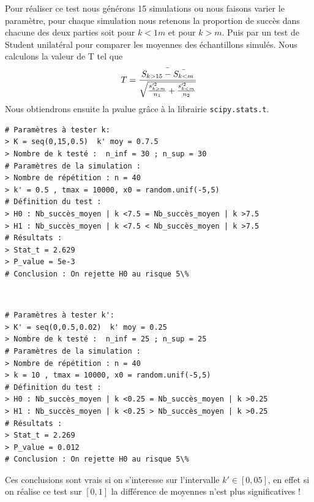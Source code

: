 \documentclass[12pt]{article}
\begin{document}
Pour réaliser ce test nous générons 15 simulations ou nous faisons varier le paramètre, pour chaque simulation nous retenons la proportion de succès dans chacune des deux parties soit pour $k<1m$ et pour $k>m$. Puis par un test de Student unilatéral pour comparer les moyennes des échantillons simulés. Nous calculons la valeur de T tel que $$T = \frac{\Bar{S_{k>15} - \Bar{S_{k<m}}}}{\sqrt{\frac{s'^2_{k>m}}{n_1} + \frac{s'^2_{k<m}}{n_2}}    }$$
Nous obtiendrons ensuite la pvalue grâce à la librairie \verb|scipy.stats.t|.

\begin{scriptsize}
\begin{verbatim}
# Paramètres à tester k:
> K = seq(0,15,0.5)  k' moy = 0.7.5   
> Nombre de k testé :  n_inf = 30 ; n_sup = 30
# Paramètres de la simulation : 
> Nombre de répétition : n = 40
> k' = 0.5 , tmax = 10000, x0 = random.unif(-5,5)
# Définition du test :
> H0 : Nb_succès_moyen | k <7.5 = Nb_succès_moyen | k >7.5 
> H1 : Nb_succès_moyen | k <7.5 < Nb_succès_moyen | k >7.5 
# Résultats :
> Stat_t = 2.629
> P_value = 5e-3
# Conclusion : On rejette H0 au risque 5\%
\end{verbatim}
\end{scriptsize}
\\
\begin{scriptsize}
\begin{verbatim}
# Paramètres à tester k':
> K' = seq(0,0.5,0.02)  k' moy = 0.25   
> Nombre de k testé :  n_inf = 25 ; n_sup = 25
# Paramètres de la simulation : 
> Nombre de répétition : n = 40
> k = 10 , tmax = 10000, x0 = random.unif(-5,5)
# Définition du test :
> H0 : Nb_succès_moyen | k <0.25 = Nb_succès_moyen | k >0.25 
> H1 : Nb_succès_moyen | k <0.25 > Nb_succès_moyen | k >0.25 
# Résultats :
> Stat_t = 2.269
> P_value = 0.012
# Conclusion : On rejette H0 au risque 5\%
\end{verbatim}
\end{scriptsize}

Ces conclusions sont vrais si on s'interesse sur l'intervalle $k'\in[0,05]$, en effet si on réalise ce test sur $[0,1]$ la différence de moyennes n'est plus significatives !
\end{document}
